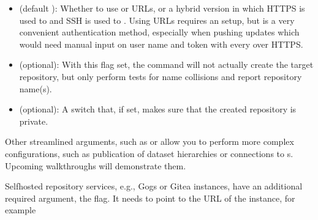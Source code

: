 \begin{itemize}
\item {} 
\sphinxAtStartPar
{} (default ): Whether to use {\hyperref[\detokenize{glossary:term-SSH}]{}} or {\hyperref[\detokenize{glossary:term-https}]{}} URLs, or a hybrid version in which HTTPS is used to  and SSH is used to . Using {\hyperref[\detokenize{glossary:term-SSH}]{}} URLs requires an {\hyperref[\detokenize{glossary:term-SSH-key}]{}} setup, but is a very convenient authentication method, especially when pushing updates \textendash{} which would need manual input on user name and token with every  over HTTPS.

\item {} 
\sphinxAtStartPar
{} (optional): With this flag set, the command will not actually create the target repository, but only perform tests for name collisions and report repository name(s).

\item {} 
\sphinxAtStartPar
{} (optional): A switch that, if set, makes sure that the created repository is private.

\end{itemize}

\sphinxAtStartPar
Other streamlined arguments, such as  or  allow you to perform more complex configurations, such as publication of dataset hierarchies or connections to {\hyperref[\detokenize{glossary:term-special-remote}]{}}s. Upcoming walk\sphinxhyphen{}throughs will demonstrate them.

\sphinxAtStartPar
Self\sphinxhyphen{}hosted repository services, e.g., Gogs or Gitea instances, have an additional required argument, the  flag.
It needs to point to the URL of the instance, for example


